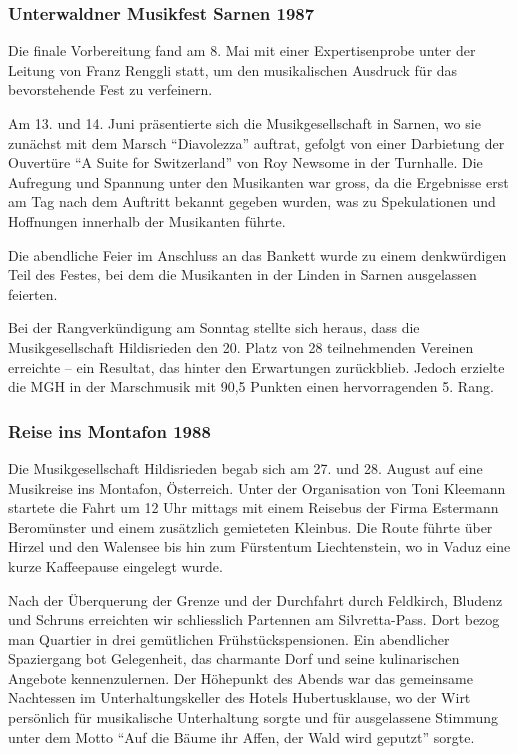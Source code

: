 \begin{history}
    \subsubsection*{Unterwaldner Musikfest Sarnen 1987}

    Die finale Vorbereitung fand am 8. Mai mit einer Expertisenprobe unter der
    Leitung von Franz Renggli statt, um den musikalischen Ausdruck für das
    bevorstehende Fest zu verfeinern.

    Am 13. und 14. Juni präsentierte sich die Musikgesellschaft in Sarnen, wo
    sie zunächst mit dem Marsch \enquote{Diavolezza} auftrat, gefolgt von einer
    Darbietung der Ouvertüre \enquote{A Suite for Switzerland} von Roy Newsome
    in der Turnhalle. Die Aufregung und Spannung unter den Musikanten war gross,
    da die Ergebnisse erst am Tag nach dem Auftritt bekannt gegeben wurden, was
    zu Spekulationen und Hoffnungen innerhalb der Musikanten führte.

    Die abendliche Feier im Anschluss an das Bankett wurde zu einem denkwürdigen
    Teil des Festes, bei dem die Musikanten in der Linden in Sarnen ausgelassen
    feierten.

    Bei der Rangverkündigung am Sonntag stellte sich heraus, dass die
    Musikgesellschaft Hildisrieden den 20. Platz von 28 teilnehmenden Vereinen
    erreichte -- ein Resultat, das hinter den Erwartungen zurückblieb. Jedoch
    erzielte die MGH in der Marschmusik mit 90,5 Punkten einen hervorragenden 5.
    Rang.

    \subsubsection*{Reise ins Montafon 1988}

    Die Musikgesellschaft Hildisrieden begab sich am 27. und 28. August auf eine
    Musikreise ins Montafon, Österreich. Unter der Organisation von Toni
    Kleemann startete die Fahrt um 12 Uhr mittags mit einem Reisebus der Firma
    Estermann Beromünster und einem zusätzlich gemieteten Kleinbus. Die Route
    führte über Hirzel und den Walensee bis hin zum Fürstentum Liechtenstein, wo
    in Vaduz eine kurze Kaffeepause eingelegt wurde.

    Nach der Überquerung der Grenze und der Durchfahrt durch Feldkirch, Bludenz
    und Schruns erreichten wir schliesslich Partennen am Silvretta-Pass. Dort
    bezog man Quartier in drei gemütlichen Frühstückspensionen. Ein abendlicher
    Spaziergang bot Gelegenheit, das charmante Dorf und seine kulinarischen
    Angebote kennenzulernen. Der Höhepunkt des Abends war das gemeinsame
    Nachtessen im Unterhaltungskeller des Hotels Hubertusklause, wo der Wirt
    persönlich für musikalische Unterhaltung sorgte und für ausgelassene
    Stimmung unter dem Motto \enquote{Auf die Bäume ihr Affen, der Wald wird
        geputzt} sorgte.


\end{history}
